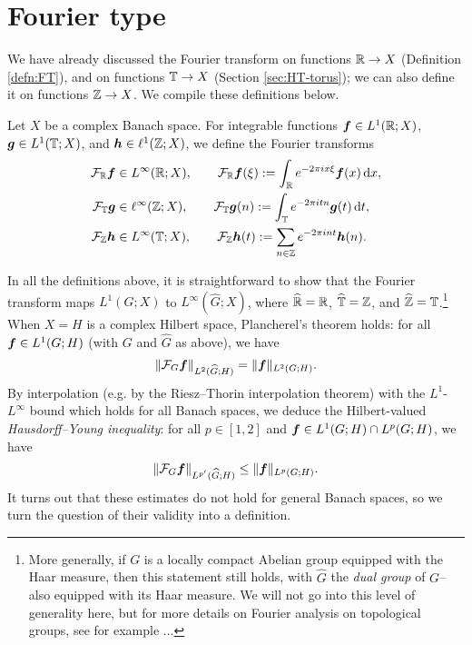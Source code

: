 \section{Fourier type}

We have already discussed the Fourier transform on functions $\mathbb{R} \to X$ (Definition \ref{defn:FT}), and on functions $\mathbb{T} \to X$ (Section \ref{sec:HT-torus}); we can also define it on functions $\mathbb{Z} \to X$.
We compile these definitions below.
\begin{defn}
  Let $X$ be a complex Banach space.
  For integrable functions $\bm{f} \in L^1(\mathbb{R};X)$, $\bm{g} \in L^1(\mathbb{T};X)$, and $\bm{h} \in \ell^{1}(\mathbb{Z};X)$, we define the Fourier transforms
  \begin{equation*}
    \begin{aligned}
      \mathcal{F}_{\mathbb{R}} \bm{f} &\in L^{\infty}(\mathbb{R};X), \qquad \mathcal{F}_{\mathbb{R}} \bm{f}(\xi) := \int_{\mathbb{R}} e^{-2\pi i x \xi} \bm{f}(x) \, \mathrm{d} x, \\
      \mathcal{F}_{\mathbb{T}} \bm{g} &\in \ell^{\infty}(\mathbb{Z};X), \qquad \mathcal{F}_{\mathbb{T}} \bm{g}(n) := \int_{\mathbb{T}} e^{-2\pi i tn} \bm{g}(t) \, \mathrm{d} t, \\
      \mathcal{F}_{\mathbb{Z}} \bm{h} &\in L^\infty(\mathbb{T};X), \qquad \mathcal{F}_{\mathbb{Z}} \bm{h}(t) := \sum_{n \in \mathbb{Z}} e^{-2\pi i nt} \bm{h}(n). \\
    \end{aligned}
  \end{equation*}
\end{defn}
In all the definitions above, it is straightforward to show that the Fourier transform maps $L^1(G;X)$ to $L^\infty(\widehat{G};X)$, where $\widehat{\mathbb{R}} = \mathbb{R}$, $\widehat{\mathbb{T}} = \mathbb{Z}$, and $\widehat{\mathbb{Z}} = \mathbb{T}$.\footnote{More generally, if $G$ is a locally compact Abelian group equipped with the Haar measure, then this statement still holds, with $\widehat{G}$ the \emph{dual group} of $G$--also equipped with its Haar measure. We will not go into this level of generality here, but for more details on Fourier analysis on topological groups, see for example ...}
When $X=H$ is a complex Hilbert space, Plancherel's theorem holds: for all $\bm{f} \in L^1(G; H)$ (with $G$ and $\widehat{G}$ as above), we have
\begin{equation*}
  \|\mathcal{F}_{G} \bm{f}\|_{L^2(\widehat{G};H)} = \|\bm{f}\|_{L^2(G;H)}.
\end{equation*}
By interpolation (e.g. by the Riesz--Thorin interpolation theorem) with the $L^1$-$L^\infty$ bound which holds for all Banach spaces, we deduce the Hilbert-valued \emph{Hausdorff--Young inequality}: for all $p \in [1,2]$ and $\bm{f} \in L^1(G;H) \cap L^p(G;H)$, we have
\begin{equation*}
  \|\mathcal{F}_{G} \bm{f}\|_{L^{p'}(\widehat{G};H)} \leq \|\bm{f}\|_{L^{p}(G;H)}.
\end{equation*}
It turns out that these estimates do not hold for general Banach spaces, so we turn the question of their validity into a definition.

